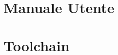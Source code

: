 \documentclass[11pt,twoside,openright,italian]{book} %
\begin{document}
\chapter{Manuale Utente} \label{chap:Manuale utente} \hypertarget{chapter::\theHchapter}{}



\chapter{Toolchain} \label{chap:Toolchain} \hypertarget{chapter::\theHchapter}{}




\backmatter
\printbibliography[title=Bibliografia, heading=bibintoc] \label{Bibliografia}
\newpage

{\chapter*{}

\label{Copertina_dietro} \thispagestyle{empty}}
\end{document}
